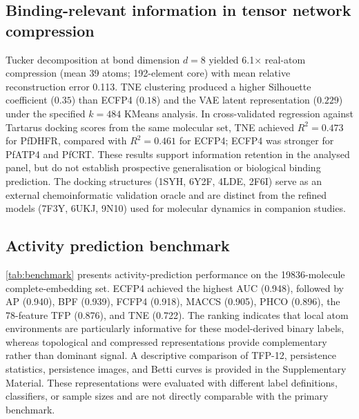 \documentclass[11pt,a4paper]{article}
\begin{document}
\subsection{Binding-relevant information in tensor network compression}

Tucker decomposition at bond dimension $d = 8$ yielded \num{6.1}$\times$ real-atom compression (mean \num{39} atoms; \num{192}-element core) with mean relative reconstruction error \num{0.113}. TNE clustering produced a higher Silhouette coefficient ($\num{0.35}$) than ECFP4 ($\num{0.18}$) and the VAE latent representation ($\num{0.229}$) under the specified $k=484$ KMeans analysis. In cross-validated regression against Tartarus docking scores from the same molecular set, TNE achieved $R^2=\num{0.473}$ for PfDHFR, compared with $R^2=\num{0.461}$ for ECFP4; ECFP4 was stronger for PfATP4 and PfCRT. These results support information retention in the analysed panel, but do not establish prospective generalisation or biological binding prediction. The docking structures (1SYH, 6Y2F, 4LDE, 2F6I) serve as an external chemoinformatic validation oracle and are distinct from the refined models (7F3Y, 6UKJ, 9N10) used for molecular dynamics in companion studies.

\subsection{Activity prediction benchmark}\label{sec:results_benchmark}

\cref{tab:benchmark} presents activity-prediction performance on the \num{19836}-molecule complete-embedding set. ECFP4 achieved the highest AUC (\num{0.948}), followed by AP (\num{0.940}), BPF (\num{0.939}), FCFP4 (\num{0.918}), MACCS (\num{0.905}), PHCO (\num{0.896}), the 78-feature TFP (\num{0.876}), and TNE (\num{0.722}). The ranking indicates that local atom environments are particularly informative for these model-derived binary labels, whereas topological and compressed representations provide complementary rather than dominant signal. A descriptive comparison of TFP-12, persistence statistics, persistence images, and Betti curves is provided in the Supplementary Material. These representations were evaluated with different label definitions, classifiers, or sample sizes and are not directly comparable with the primary benchmark.
\end{document}
